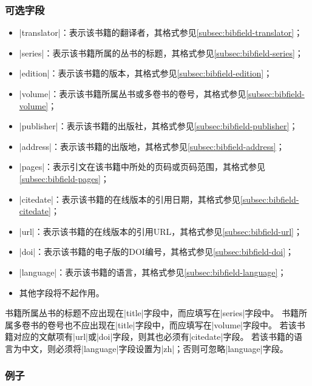 \subsubsection{可选字段}

\begin{itemize}
\item |translator|：表示该书籍的翻译者，其格式参见\ref{subsec:bibfield-translator}；
\item |series|：表示该书籍所属的丛书的标题，其格式参见\ref{subsec:bibfield-series}；
\item |edition|：表示该书籍的版本，其格式参见\ref{subsec:bibfield-edition}；
\item |volume|：表示该书籍所属丛书或多卷书的卷号，其格式参见\ref{subsec:bibfield-volume}；
\item |publisher|：表示该书籍的出版社，其格式参见\ref{subsec:bibfield-publisher}；
\item |address|：表示该书籍的出版地，其格式参见\ref{subsec:bibfield-address}；
\item |pages|：表示引文在该书籍中所处的页码或页码范围，其格式参见\ref{subsec:bibfield-pages}；
\item |citedate|：表示该书籍的在线版本的引用日期，其格式参见\ref{subsec:bibfield-citedate}；
\item |url|：表示该书籍的在线版本的引用URL，其格式参见\ref{subsec:bibfield-url}；
\item |doi|：表示该书籍的电子版的DOI编号，其格式参见\ref{subsec:bibfield-doi}；
\item |language|：表示该书籍的语言，其格式参见\ref{subsec:bibfield-language}；
\item 其他字段将不起作用。
\end{itemize}

\begin{note}
书籍所属丛书的标题不应出现在|title|字段中，而应填写在|series|字段中。
书籍所属多卷书的卷号也不应出现在|title|字段中，而应填写在|volume|字段中。
若该书籍对应的文献项有|url|或|doi|字段，则其也必须有|citedate|字段。
若该书籍的语言为中文，则必须将|language|字段设置为|zh|；否则可忽略|language|字段。
\end{note}

\subsubsection{例子}

